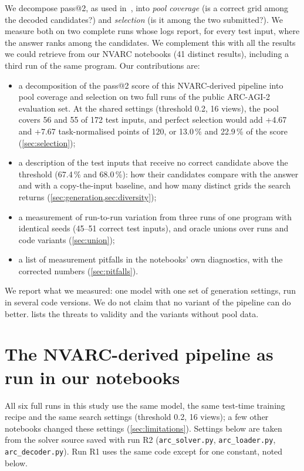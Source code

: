 \documentclass[11pt]{article}
\newcommand{\code}[1]{\texttt{#1}}
\newcommand{\R}[1]{R#1}
\begin{document}
We decompose pass@2, as used in~\citet{chen2021codex}, into \emph{pool coverage} (is a correct grid among the decoded candidates?) and \emph{selection} (is it among the two submitted?). We measure both on two complete runs whose logs report, for every test input, where the answer ranks among the candidates.
We complement this with all the results we could retrieve from our NVARC notebooks (41 distinct results), including a third run of the same program.
Our contributions are:
\begin{itemize}
\item a decomposition of the pass@2 score of this NVARC-derived pipeline into pool coverage and selection on two full runs of the public ARC-AGI-2 evaluation set. At the shared settings (threshold 0.2, 16 views), the pool covers 56 and 55 of 172 test inputs, and perfect selection would add +4.67 and +7.67 task-normalised points of 120, or 13.0\,\% and 22.9\,\% of the score (\cref{sec:selection});
\item a description of the test inputs that receive no correct candidate above the threshold (67.4\,\% and 68.0\,\%): how their candidates compare with the answer and with a copy-the-input baseline, and how many distinct grids the search returns (\cref{sec:generation,sec:diversity});
\item a measurement of run-to-run variation from three runs of one program with identical seeds (45--51 correct test inputs), and oracle unions over runs and code variants (\cref{sec:union});
\item a list of measurement pitfalls in the notebooks' own diagnostics, with the corrected numbers (\cref{sec:pitfalls}).
\end{itemize}
We report what we measured: one model with one set of generation settings, run in several code versions. We do not claim that no variant of the pipeline can do better.  lists the threats to validity and the variants without pool data.

\section{The NVARC-derived pipeline as run in our notebooks}
\label{sec:pipeline}

All six full runs in this study use the same model, the same test-time training recipe and the same search settings (threshold 0.2, 16 views); a few other notebooks changed these settings (\cref{sec:limitations}). Settings below are taken from the solver source saved with run \R{2} (\code{arc\_solver.py}, \code{arc\_loader.py}, \code{arc\_decoder.py}). Run \R{1} uses the same code except for one constant, noted below.
\end{document}
